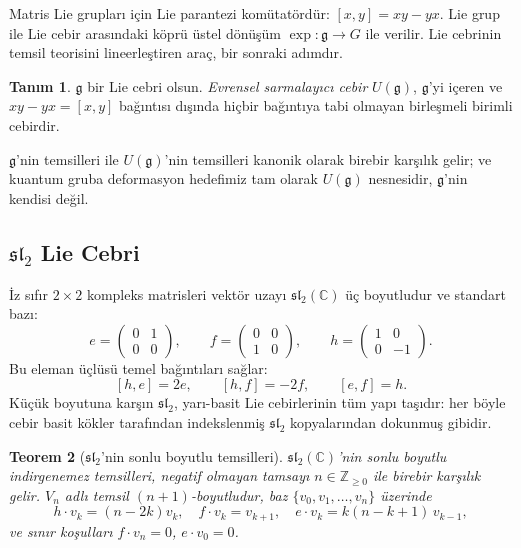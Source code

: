 \documentclass[10pt]{math}
\numberwithin{equation}{section}
\theoremstyle{plain}
\newtheorem{theorem}{Teorem}[section]
\theoremstyle{definition}
\newtheorem{definition}[theorem]{Tanım}
\renewcommand{\sl}{\mathfrak{sl}}
\newcommand{\gfrak}{\mathfrak{g}}
\newcommand{\C}{\mathbb{C}}
\newcommand{\Z}{\mathbb{Z}}
\begin{document}
Matris Lie grupları için Lie parantezi komütatördür: $[x,y] = xy - yx$.
Lie grup ile Lie cebir arasındaki köprü üstel dönüşüm $\exp : \gfrak \to G$ ile
verilir. Lie cebrinin temsil teorisini lineerleştiren araç, bir sonraki
adımdır.

\begin{definition}
$\gfrak$ bir Lie cebri olsun. \emph{Evrensel sarmalayıcı cebir} $U(\gfrak)$,
$\gfrak$'yi içeren ve $xy - yx = [x,y]$ bağıntısı dışında hiçbir bağıntıya
tabi olmayan birleşmeli birimli cebirdir.
\end{definition}

$\gfrak$'nin temsilleri ile $U(\gfrak)$'nin temsilleri kanonik olarak birebir
karşılık gelir; ve kuantum gruba deformasyon hedefimiz tam olarak $U(\gfrak)$
nesnesidir, $\gfrak$'nin kendisi değil.

\subsection{$\sl_2$ Lie Cebri}

İz sıfır $2 \times 2$ kompleks matrisleri vektör uzayı $\sl_2(\C)$ üç
boyutludur ve standart bazı:
\[
  e = \begin{pmatrix} 0 & 1 \\ 0 & 0 \end{pmatrix},\qquad
  f = \begin{pmatrix} 0 & 0 \\ 1 & 0 \end{pmatrix},\qquad
  h = \begin{pmatrix} 1 & 0 \\ 0 & -1 \end{pmatrix}.
\]
Bu eleman üçlüsü temel bağıntıları sağlar:
\begin{equation}\label{eq:sl2-rels}
  [h,e] = 2e, \qquad [h,f] = -2f, \qquad [e,f] = h.
\end{equation}
Küçük boyutuna karşın $\sl_2$, yarı-basit Lie cebirlerinin tüm yapı
taşıdır: her böyle cebir basit kökler tarafından indekslenmiş $\sl_2$
kopyalarından dokunmuş gibidir.

\begin{theorem}[$\sl_2$'nin sonlu boyutlu temsilleri]
$\sl_2(\C)$'nin sonlu boyutlu indirgenemez temsilleri, negatif olmayan
tamsayı $n \in \Z_{\geq 0}$ ile birebir karşılık gelir. $V_n$ adlı temsil
$(n+1)$-boyutludur, baz $\{v_0, v_1, \dots, v_n\}$ üzerinde
\[
  h \cdot v_k = (n - 2k) v_k, \quad
  f \cdot v_k = v_{k+1}, \quad
  e \cdot v_k = k(n-k+1)\, v_{k-1},
\]
ve sınır koşulları $f \cdot v_n = 0$, $e \cdot v_0 = 0$.
\end{theorem}
\end{document}
